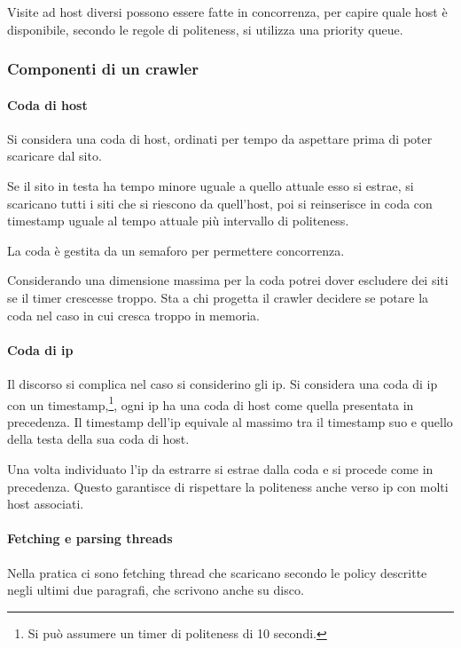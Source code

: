 Visite ad host diversi possono essere fatte in concorrenza, per capire 
quale host è disponibile, secondo le regole di politeness, si utilizza una priority queue.

\subsubsection{Componenti di un crawler}

\paragraph{Coda di host}
Si considera una coda di host, ordinati per tempo da aspettare 
prima di poter scaricare dal sito. 

Se il sito in testa ha tempo minore uguale a quello attuale esso si estrae, 
si scaricano tutti i siti che si riescono da quell'host, poi si reinserisce 
in coda con timestamp uguale al tempo attuale più intervallo di politeness.

La coda è gestita da un semaforo per permettere concorrenza.

\begin{remark}
    Considerando una dimensione massima per la coda potrei dover
    escludere dei siti se il timer crescesse troppo. Sta a chi progetta 
    il crawler decidere se potare la coda nel caso in cui cresca troppo in 
    memoria.
\end{remark}

\paragraph{Coda di ip}
Il discorso si complica nel caso si considerino gli ip. 
Si considera una coda di ip con un timestamp,\footnote{Si può assumere
un timer di politeness di 10 secondi.}, ogni ip ha una coda di host 
come quella presentata in precedenza.
Il timestamp dell'ip equivale al massimo tra il timestamp suo e quello 
della testa della sua coda di host.

Una volta individuato l'ip da estrarre si estrae dalla coda e si procede 
come in precedenza.
Questo garantisce di rispettare la politeness anche verso ip con molti 
host associati.

\paragraph{Fetching e parsing threads}
Nella pratica ci sono fetching thread che scaricano secondo le policy descritte 
negli ultimi due paragrafi, che scrivono anche su disco.


